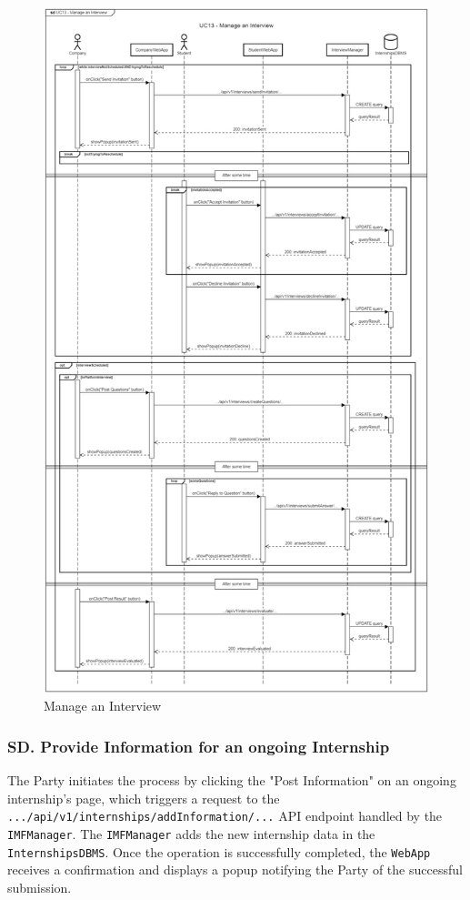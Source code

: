 \newpage

\begin{figure}[H]
    \begin{center}
         \includegraphics[width=0.8\linewidth]{LaTeXCode/images/SequenceDiagrams/UC13-sequenceDiagram.png}
         \caption{Manage an Interview}
         \label{fig:manage_interview_sd}
     \end{center}
\end{figure}

\subsubsection*{SD\cuc. Provide Information for an ongoing Internship}
\label{subsubsec:provide_information_ongoing_sd}
The Party initiates the process by clicking the "Post Information"  on an ongoing internship's page, which triggers a request to the \texttt{.../api/v1/internships/addInformation/...} API endpoint handled by the \texttt{IMFManager}. The \texttt{IMFManager} adds the new internship data in the \texttt{InternshipsDBMS}. Once the operation is successfully completed, the \texttt{WebApp} receives a confirmation and displays a popup notifying the Party of the successful submission.

